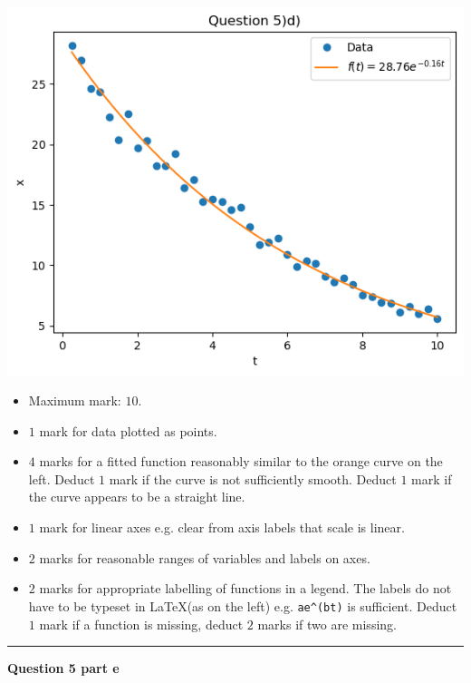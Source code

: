 \documentclass[oneside,12pt]{article}
\begin{document}
	\begin{minipage}{0.49\textwidth}
		\includegraphics[scale=0.65]{q5d.png}
	\end{minipage}
	\begin{minipage}{0.49\textwidth}
		\begin{itemize}
			\item Maximum mark: \(10\).
			\item \(1\) mark for data plotted as points.
			\item \(4\) marks for a fitted function reasonably similar to the orange curve on the left. Deduct \(1\) mark if the curve is not sufficiently smooth. Deduct \(1\) mark if the curve appears to be a straight line.
			\item \(1\) mark for linear axes e.g. clear from axis labels that scale is linear.
			\item \(2\) marks for reasonable ranges of variables and labels on axes.
			\item \(2\) marks for appropriate labelling of functions in a legend. The labels do not have to be typeset in \LaTeX (as on the left) e.g. \verb|ae^(bt)| is sufficient. Deduct \(1\) mark if a function is missing, deduct \(2\) marks if two are missing.
		\end{itemize}
	\end{minipage}
	
	\vspace*{15pt}
	\hrule height 1pt
	
	\noindent\textbf{Question 5 part e}
	
\end{document}
